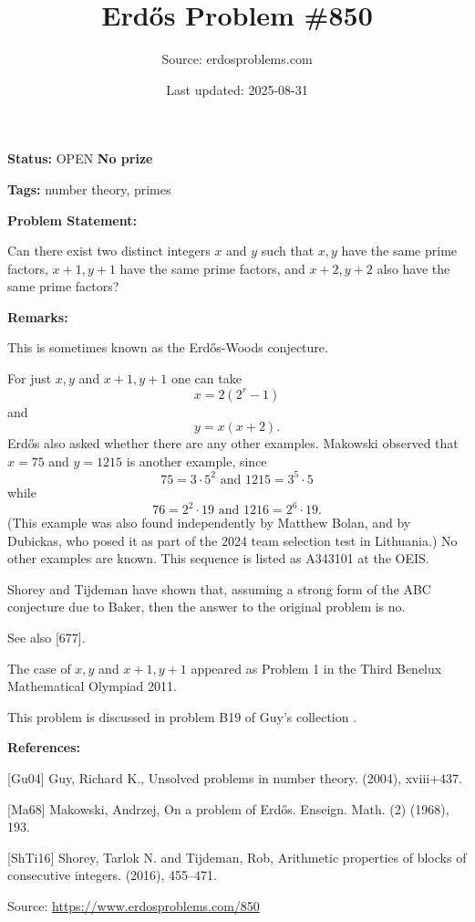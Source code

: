 \documentclass{article}
\title{Erd\H{o}s Problem \#850}
\date{Last updated: 2025-08-31}
\author{Source: erdosproblems.com}
\begin{document}
\maketitle

\noindent\textbf{Status:} OPEN \quad \textbf{No prize}

\noindent\textbf{Tags:} number theory, primes

\medskip
\noindent\textbf{Problem Statement:}

Can there exist two distinct integers $x$ and $y$ such that $x,y$ have the same prime factors, $x+1,y+1$ have the same prime factors, and $x+2,y+2$ also have the same prime factors?

\bigskip
\noindent\textbf{Remarks:}

This is sometimes known as the Erd\H{o}s-Woods conjecture.

For just $x,y$ and $x+1,y+1$ one can take\[x=2(2^r-1)\]and\[y = x(x+2).\]Erd\H{o}s also asked whether there are any other examples. Makowski \cite{Ma68} observed that $x=75$ and $y=1215$ is another example, since\[75 = 3\cdot 5^2 \textrm{ and }1215 = 3^5\cdot 5\]while\[76 = 2^2\cdot 19\textrm{ and }1216 = 2^6\cdot 19.\](This example was also found independently by Matthew Bolan, and by Dubickas, who posed it as part of the 2024 team selection test in Lithuania.) No other examples are known. This sequence is listed as A343101 at the OEIS.

Shorey and Tijdeman \cite{ShTi16} have shown that, assuming a strong form of the ABC conjecture due to Baker, then the answer to the original problem is no.

See also [677]. 

The case of $x,y$ and $x+1,y+1$ appeared as Problem 1 in the Third Benelux Mathematical Olympiad 2011. 

This problem is discussed in problem B19 of Guy's collection \cite{Gu04}.

\bigskip
\noindent\textbf{References:}

[Gu04] Guy, Richard K., Unsolved problems in number theory. (2004), xviii+437.
 
 [Ma68] Makowski, Andrzej, On a problem of {E}rd\H{o}s. Enseign. Math. (2) (1968), 193.
 
 [ShTi16] Shorey, Tarlok N. and Tijdeman, Rob, Arithmetic properties of blocks of consecutive integers. (2016), 455--471.

\bigskip
\noindent\small{Source: \url{https://www.erdosproblems.com/850}}
\end{document}
